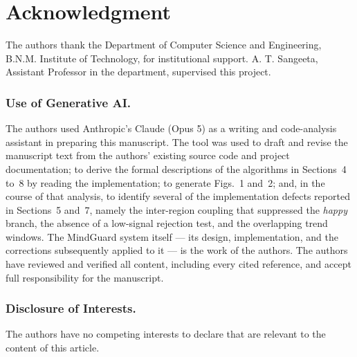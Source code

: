 \documentclass[runningheads]{llncs}
\begin{document}
\section*{Acknowledgment}

The authors thank the Department of Computer Science and Engineering,
B.N.M. Institute of Technology, for institutional support. A. T. Sangeeta,
Assistant Professor in the department, supervised this project.

\subsubsection*{Use of Generative AI.}
The authors used Anthropic's Claude (Opus 5) as a writing and code-analysis
assistant in preparing this manuscript. The tool was used to draft and revise
the manuscript text from the authors' existing source code and project
documentation; to derive the formal descriptions of the algorithms in
Sections~4 to~8 by reading the implementation; to generate Figs.~1 and~2; and,
in the course of that analysis, to identify several of the implementation
defects reported in Sections~5 and~7, namely the inter-region coupling that
suppressed the \textit{happy} branch, the absence of a low-signal rejection
test, and the overlapping trend windows. The MindGuard system itself --- its
design, implementation, and the corrections subsequently applied to it --- is
the work of the authors. The authors have reviewed and verified all content,
including every cited reference, and accept full responsibility for the
manuscript.

\subsubsection*{Disclosure of Interests.}
The authors have no competing interests to declare that are relevant to the
content of this article.
\end{document}
